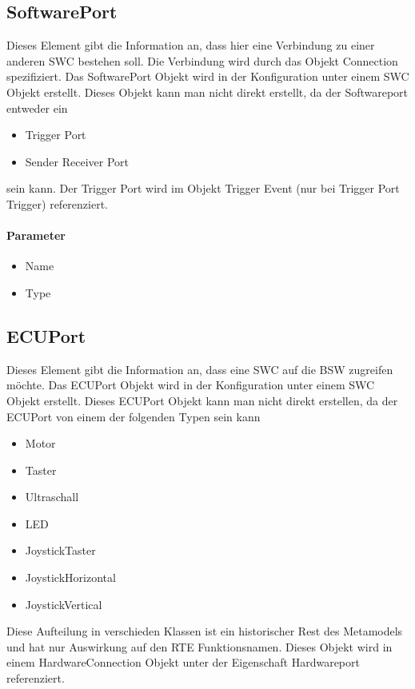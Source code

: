 \subsection{SoftwarePort}
Dieses Element gibt die Information an, dass hier eine Verbindung zu einer anderen SWC bestehen soll. Die Verbindung wird durch das Objekt \frqq{}Connection\flqq{} spezifiziert. Das \frqq{}SoftwarePort\flqq{} Objekt wird in der Konfiguration unter einem \frqq{}SWC\flqq{} Objekt erstellt. Dieses Objekt kann man nicht direkt erstellt, da der Softwareport entweder ein
\begin{itemize}
\item \frqq{}Trigger Port\flqq{}
\item \frqq{}Sender Receiver Port\flqq{}
\end{itemize}  
sein kann. Der \frqq{}Trigger Port\flqq{} wird im Objekt \frqq{}Trigger Event\flqq{} (nur bei \frqq{}Trigger Port Trigger\flqq{}) referenziert.
\paragraph{Parameter}
\begin{itemize}
\item Name
\item Type
\end{itemize}



\subsection{ECUPort}
Dieses Element gibt die Information an, dass eine SWC auf die BSW zugreifen möchte. Das \frqq{}ECUPort\flqq{} Objekt wird in der Konfiguration unter einem \frqq{}SWC\flqq{} Objekt erstellt. Dieses \frqq{}ECUPort\flqq{} Objekt kann man nicht direkt erstellen, da der ECUPort von einem der folgenden Typen sein kann
\begin{itemize}
\item \frqq{}Motor\flqq{}
\item \frqq{}Taster\flqq{}
\item \frqq{}Ultraschall\flqq{}
\item \frqq{}LED\flqq{}
\item \frqq{}JoystickTaster\flqq{}
\item \frqq{}JoystickHorizontal\flqq{}
\item  \frqq{}JoystickVertical\flqq{}
\end{itemize}
Diese Aufteilung in verschieden Klassen ist ein historischer Rest des Metamodels und hat nur Auswirkung auf den RTE Funktionsnamen. Dieses Objekt wird in einem \frqq{}HardwareConnection\flqq{} Objekt unter der Eigenschaft Hardwareport referenziert.
